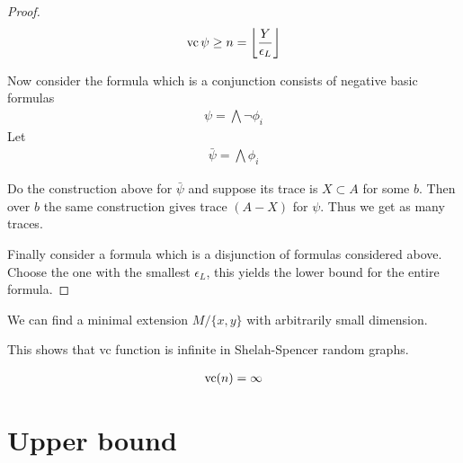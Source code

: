 \documentclass{amsart}
\providecommand{\floor}[1]{\left \lfloor #1 \right \rfloor }
\begin{document}
\begin{proof}
	\begin{align*}
		\vc \psi \geq n = \floor{\frac{Y}{\epsilon_L}}
	\end{align*}

	Now consider the formula which is a conjunction consists of negative basic formulas
	\begin{align*}
		\psi = \bigwedge \neg \phi_i
	\end{align*}
	Let
	\begin{align*}
		\bar \psi = \bigwedge \phi_i
	\end{align*}

	Do the construction above for $\bar \psi$ and suppose its trace is $X \subset A$ for some $b$.
	Then over $b$ the same construction gives trace $(A - X)$ for $\psi$. Thus we get as many traces.
	
	Finally consider a formula which is a disjunction of formulas considered above.
	Choose the one with the smallest $\epsilon_L$, this yields the lower bound for the entire formula. %
\end{proof}

\begin{Claim}
	We can find a minimal extension $M / \{x, y\}$ with arbitrarily small dimension.
\end{Claim}

This shows that vc function is infinite in Shelah-Spencer random graphs.

\begin{align*}
	\operatorname{vc}(n) = \infty
\end{align*}

\section{Upper bound}





%
\end{document}

